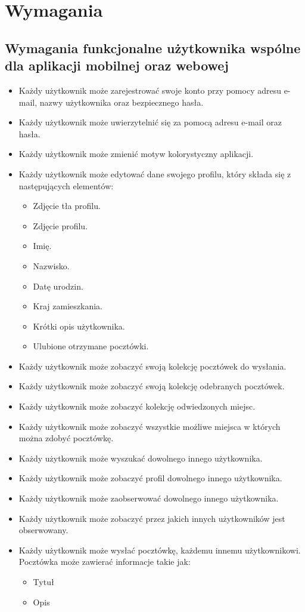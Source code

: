 \documentclass[a4paper,twoside,12pt]{book}
\begin{document}
\chapter{Wymagania}
\label{ch:wymagania}

\section{Wymagania funkcjonalne użytkownika wspólne dla aplikacji mobilnej oraz webowej}
\begin{itemize}
    \item Każdy użytkownik może zarejestrować swoje konto przy pomocy adresu e-mail, nazwy użytkownika oraz bezpiecznego hasła.
    \item Każdy użytkownik może uwierzytelnić się za pomocą adresu e-mail oraz hasła.
    \item Każdy użytkownik może zmienić motyw kolorystyczny aplikacji.
    \item Każdy użytkownik może edytować dane swojego profilu, który składa się z następujących elementów:
    \begin{itemize}
        \item Zdjęcie tła profilu.
        \item Zdjęcie profilu.
        \item Imię.
        \item Nazwisko.
        \item Datę urodzin.
        \item Kraj zamieszkania.
        \item Krótki opis użytkownika.
        \item Ulubione otrzymane pocztówki.
    \end{itemize}
    \item Każdy użytkownik może zobaczyć swoją kolekcję pocztówek do wysłania.
    \item Każdy użytkownik może zobaczyć swoją kolekcję odebranych pocztówek.
    \item Każdy użytkownik może zobaczyć kolekcję odwiedzonych miejsc.
    \item Każdy użytkownik może zobaczyć wszystkie możliwe miejsca w których można zdobyć pocztówkę.
    \item Każdy użytkownik może wyszukać dowolnego innego użytkownika.
    \item Każdy użytkownik może zobaczyć profil dowolnego innego użytkownika.
    \item Każdy użytkownik może zaobserwować dowolnego innego użytkownika.
    \item Każdy użytkownik może zobaczyć przez jakich innych użytkowników jest obserwowany.
    \item Każdy użytkownik może wysłać pocztówkę, każdemu innemu użytkownikowi. Pocztówka może zawierać informacje takie jak:
    \begin{itemize}
        \item Tytuł
        \item Opis
    \end{itemize}
\end{itemize}
\end{document}
